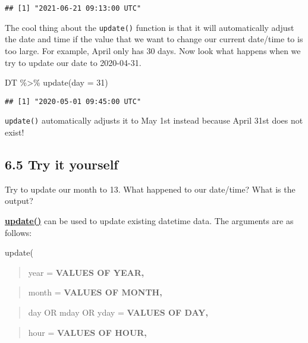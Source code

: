 \documentclass[
]{book}
\newenvironment{Shaded}{\begin{snugshade}}{\end{snugshade}}
\newcommand{\AttributeTok}[1]{\textcolor[rgb]{0.77,0.63,0.00}{#1}}
\newcommand{\DecValTok}[1]{\textcolor[rgb]{0.00,0.00,0.81}{#1}}
\newcommand{\FunctionTok}[1]{\textcolor[rgb]{0.00,0.00,0.00}{#1}}
\newcommand{\NormalTok}[1]{#1}
\newcommand{\SpecialCharTok}[1]{\textcolor[rgb]{0.00,0.00,0.00}{#1}}
\begin{document}
\begin{verbatim}
## [1] "2021-06-21 09:13:00 UTC"
\end{verbatim}

The cool thing about the \texttt{update()} function is that it will automatically adjust the date and time if the value that we want to change our current date/time to is too large. For example, April only has 30 days. Now look what happens when we try to update our date to 2020-04-31.

\begin{Shaded}
\begin{Highlighting}[]
\NormalTok{DT }\SpecialCharTok{\%\textgreater{}\%}
    \FunctionTok{update}\NormalTok{(}\AttributeTok{day =} \DecValTok{31}\NormalTok{)}
\end{Highlighting}
\end{Shaded}

\begin{verbatim}
## [1] "2020-05-01 09:45:00 UTC"
\end{verbatim}

\texttt{update()} automatically adjusts it to May 1st instead because April 31st does not exist!

\hypertarget{try-it-yourself-32}{%
\subsection{6.5 Try it yourself}\label{try-it-yourself-32}}

Try to update our month to 13. What happened to our date/time? What is the output?

\textbf{\href{https://lubridate.tidyverse.org/reference/DateTimeUpdate.html}{update()}} can be used to update existing datetime data. The arguments are as follows:

update(

\begin{quote}
year = \textbf{VALUES OF YEAR,}
\end{quote}

\begin{quote}
month = \textbf{VALUES OF MONTH,}
\end{quote}

\begin{quote}
day OR mday OR yday = \textbf{VALUES OF DAY,}
\end{quote}

\begin{quote}
hour = \textbf{VALUES OF HOUR,}
\end{quote}
\end{document}
